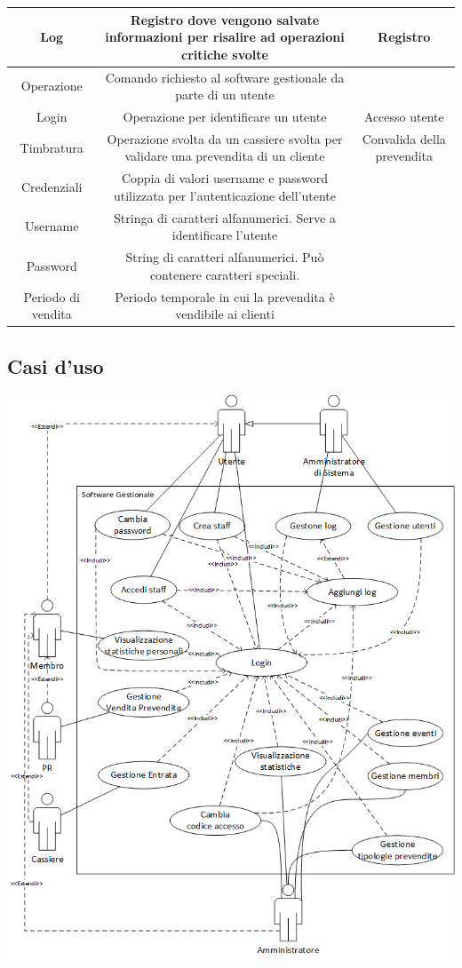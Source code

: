 \documentclass[a4paper]{article}
\begin{document}
\begin{table}[ht!]
\begin{center}
\begin{tabulary}{1\textwidth}{c|C|C}
		\hline
		Log & Registro dove vengono salvate informazioni per risalire ad operazioni critiche svolte & Registro \\
		\hline
		Operazione & Comando richiesto al software gestionale da parte di un utente & \\
		\hline
		Login & Operazione per identificare un utente & Accesso utente \\
		\hline
		Timbratura & Operazione svolta da un cassiere svolta per validare una prevendita di un cliente & Convalida della prevendita \\
		\hline
		Credenziali & Coppia di valori username e password utilizzata per l'autenticazione dell'utente & \\
		\hline
		Username & Stringa di caratteri alfanumerici. Serve a identificare l'utente & \\
		\hline
		Password & String di caratteri alfanumerici. Può contenere caratteri speciali. & \\
		\hline
		Periodo di vendita & Periodo temporale in cui la prevendita è vendibile ai clienti & \\
		\hline
    \end{tabulary}
  \end{center}
\end{table}

\newpage

\subsection{Casi d'uso}

\includegraphics[scale=0.9]{use_cases.png}
\end{document}
